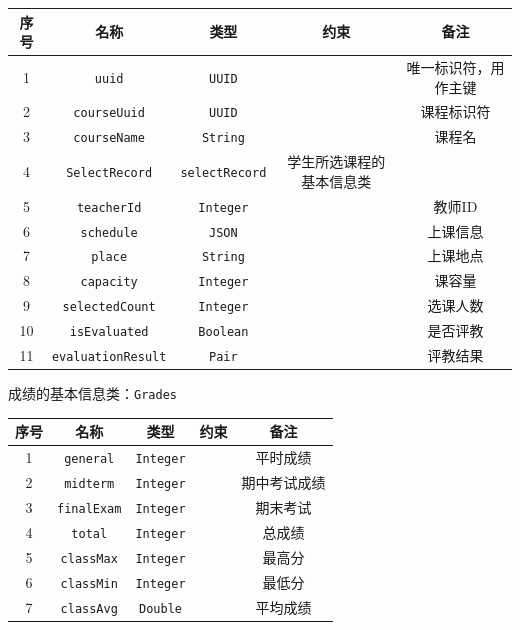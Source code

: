 \documentclass{article}
\begin{document}
\begin{enumerate}
\begin{table}[H]
  \centering
    \begin{tabular}{ccccc}
    \hline
    序号&名称    & 类型    & 约束    & 备注 \\
    \hline
    1&\texttt{uuid}  & \texttt{UUID}  &       & 唯一标识符，用作主键 \\
    2&\texttt{courseUuid} & \texttt{UUID}   &       & 课程标识符 \\
    3&\texttt{courseName} & \texttt{String} &       & 课程名 \\
    4&\texttt{SelectRecord} & \texttt{selectRecord}   & 学生所选课程的基本信息类      &  \\
    5&\texttt{teacherId} & \texttt{Integer} &       & 教师ID \\
    6&\texttt{schedule} & \texttt{JSON} &  & 上课信息 \\
    7&\texttt{place} & \texttt{String} &       & 上课地点 \\
    8&\texttt{capacity} & \texttt{Integer} &       & 课容量 \\
    9&\texttt{selectedCount} & \texttt{Integer} &       & 选课人数 \\
    10&\texttt{isEvaluated} & \texttt{Boolean} &       & 是否评教 \\
    11&\texttt{evaluationResult} & \texttt{Pair} &       & 评教结果 \\
    \hline
    \end{tabular}%
\end{table}%

\newpage

成绩的基本信息类：\texttt{Grades}
\begin{table}[H]
  \centering
    \begin{tabular}{ccccc}
    \hline
    序号&名称    & 类型    & 约束    & 备注 \\
    \hline
    1&\texttt{general}  & \texttt{Integer}  &       & 平时成绩 \\
    2&\texttt{midterm} & \texttt{Integer}   &  & 期中考试成绩 \\
    3&\texttt{finalExam} & \texttt{Integer} &       & 期末考试 \\
    4&\texttt{total} & \texttt{Integer} &       & 总成绩 \\
    5&\texttt{classMax} & \texttt{Integer} &       & 最高分 \\
    6&\texttt{classMin} & \texttt{Integer} &       & 最低分 \\
    7&\texttt{classAvg} & \texttt{Double} &       & 平均成绩 \\
    \hline
    \end{tabular}%
\end{table}%


\end{enumerate}
\end{document}
